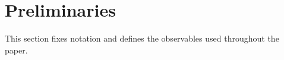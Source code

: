 \documentclass{article}
\theoremstyle{plain}
\theoremstyle{definition}
\theoremstyle{remark}
\begin{document}


\section{Preliminaries}\label{sec:prelim}
This section fixes notation and defines the observables used throughout the paper.
\end{document}
